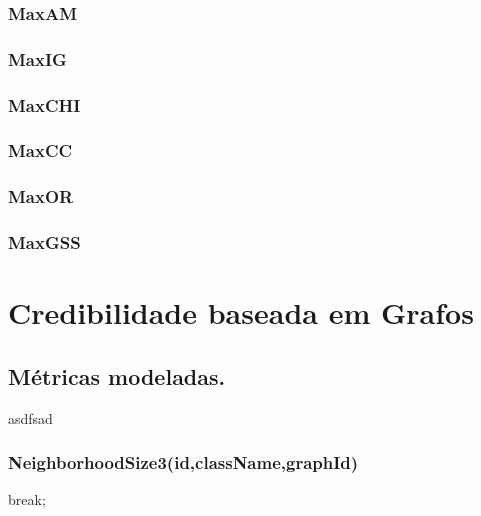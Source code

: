 \subsubsection{MaxAM}
\label{subsubsection::maxam}

\subsubsection{MaxIG}
\label{subsubsection::maxig}

\subsubsection{MaxCHI}
\label{subsubsection::maxchi}

\subsubsection{MaxCC}
\label{subsubsection::maxcc}

\subsubsection{MaxOR}
\label{subsubsection::maxor}

\subsubsection{MaxGSS}
\label{subsubsection::maxgss}


\section{Credibilidade baseada em Grafos}
\label{sec::pg_cred_baseada_grafos}

\subsection{Métricas modeladas.}
\label{subsec::pg_metricas_grafos}

asdfsad


\subsubsection{NeighborhoodSize3(id,className,graphId)}
\label{subsubsection::neighborhoodsize}

break;


